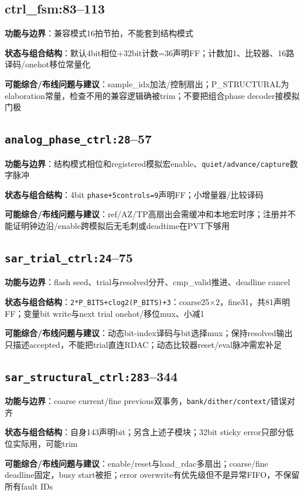 \documentclass[UTF8,fontset=fandol,10pt,a4paper,openany]{ctexrep}
\newcommand{\code}[1]{\nolinkurl{#1}}
\begin{document}
\subsection*{ctrl\_fsm:83–113}
\noindent\textbf{功能与边界}：兼容模式16拍节拍，不能套到结构模式\par
\noindent\textbf{状态与组合结构}：默认4bit相位+32bit计数=36声明FF；计数加1、比较器、16路译码/onehot移位常量化\par
\noindent\textbf{可能综合/布线问题与建议}：sample\_idx加法/控制扇出；P\_STRUCTURAL为elaboration常量，检查不用的兼容逻辑确被trim；不要把组合phase decoder接模拟门极\par
\subsection*{\code{analog_phase_ctrl:28}–57}
\noindent\textbf{功能与边界}：结构模式相位和registered模拟宏enable、\code{quiet/advance/capture}数字脉冲\par
\noindent\textbf{状态与组合结构}：4bit \code{phase+5controls=9}声明FF；小增量器/比较译码\par
\noindent\textbf{可能综合/布线问题与建议}：ref/AZ/TP高扇出会需缓冲和本地宏时序；注册并不能证明钟边沿/enable跨模拟后无毛刺或deadtime在PVT下够用\par
\subsection*{\code{sar_trial_ctrl:24}–75}
\noindent\textbf{功能与边界}：flash seed、trial与resolved分开、cmp\_valid推进、deadline cancel\par
\noindent\textbf{状态与组合结构}：\code{2*P_BITS+clog2(P_BITS)+3}：coarse25\ensuremath{\times}2，fine31，共81声明FF；变量bit write与next trial onehot/移位mux、小减1\par
\noindent\textbf{可能综合/布线问题与建议}：动态bit-index译码与bit选择mux；保持resolved输出只描述accepted，不能把trial直连RDAC；动态比较器reset/eval脉冲需宏补足\par
\subsection*{\code{sar_structural_ctrl:283}–344}
\noindent\textbf{功能与边界}：coarse current/fine previous双事务，\code{bank/dither/context/}错误对齐\par
\noindent\textbf{状态与组合结构}：自身143声明bit；另含上述子模块；32bit sticky error只部分低位实际用，可能trim\par
\noindent\textbf{可能综合/布线问题与建议}：enable/reset与load\_rdac多扇出；coarse/fine deadline固定，busy start被拒；error overwrite有优先级但不是异常FIFO，不保留所有fault IDs\par
\end{document}
